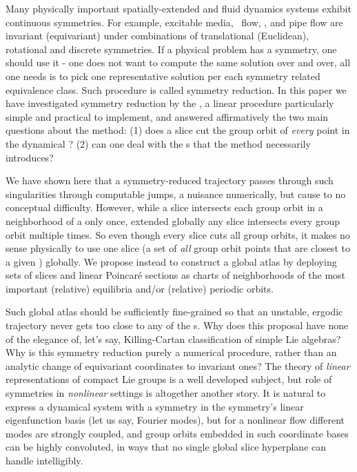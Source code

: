\documentclass[preprint,12pt]{elsarticle} %
\begin{document}
Many physically important spatially-extended and fluid dynamics systems
exhibit continuous symmetries. For example,  excitable
media, \KS\
flow, {\pCf}, and
pipe flow\rf{Wk04,Kerswell05} are invariant (equivariant) under
combinations of translational (Euclidean), rotational and discrete
symmetries. If a physical problem has a symmetry, one should use it - one
does not want to compute the same solution over and over, all one needs
is to pick one representative solution per each symmetry related
equivalence class. Such procedure is called symmetry reduction.  In this
paper we have investigated symmetry reduction by the \mslices, a linear
procedure particularly simple and practical to implement, and answered
affirmatively the two main questions about the method:
(1) does a slice cut the group orbit of \emph{every} point in the
dynamical \statesp?
(2) can one deal with the {\sset s} that the method necessarily
introduces?

We have shown here that a symmetry-reduced trajectory passes through such
singularities through computable jumps, a nuisance numerically, but cause
to no conceptual difficulty. However, while a slice intersects each group
orbit in a neighborhood of a {\template} only once, extended globally any
slice intersects every group orbit multiple times. So even though every
slice cuts all group orbits, it makes no sense physically to use one
slice (a set of \emph{all} group orbit points that are closest to a given
{\template}) globally. We propose instead to construct a global atlas by
deploying sets of slices and linear Poincar\'e sections as charts of
neighborhoods of the most important (relative) equilibria and/or
(relative) periodic orbits.

Such global atlas should be sufficiently fine-grained so that an
unstable, ergodic trajectory never gets too close to any of the {\sset
s}. Why does this proposal have none of the elegance of, let's say,
Killing-Cartan classification of simple Lie algebras? Why is this
symmetry reduction purely a numerical procedure, rather than an analytic
change of equivariant coordinates to invariant ones? The theory of
\emph{linear} representations of compact Lie groups is a well developed
subject, but role of symmetries in \emph{nonlinear} settings is
altogether another story. It is natural to express a dynamical system
with a symmetry in the symmetry's linear eigenfunction basis (let  us
say, Fourier modes), but for a nonlinear flow different modes are
strongly coupled, and group orbits embedded in such coordinate bases can
be highly convoluted, in ways that no single global slice
hyperplane can handle intelligibly.
\end{document}
